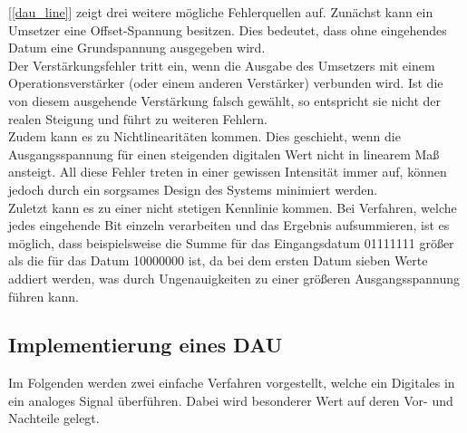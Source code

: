 [\ref{dau_line}] zeigt drei weitere mögliche Fehlerquellen auf. Zunächst kann ein Umsetzer eine Offset-Spannung besitzen. Dies bedeutet, dass ohne eingehendes Datum eine Grundspannung ausgegeben wird.\\
Der Verstärkungsfehler tritt ein, wenn die Ausgabe des Umsetzers mit einem Operationsverstärker (oder einem anderen Verstärker) verbunden wird. Ist die von diesem ausgehende Verstärkung falsch gewählt, so entspricht sie nicht der realen Steigung und führt zu weiteren Fehlern.\\
Zudem kann es zu Nichtlinearitäten kommen. Dies geschieht, wenn die Ausgangsspannung für einen steigenden digitalen Wert nicht in linearem Maß ansteigt. All diese Fehler treten in einer gewissen Intensität immer auf, können jedoch durch ein sorgsames Design des Systems minimiert werden.\\
Zuletzt kann es zu einer nicht stetigen Kennlinie kommen. Bei Verfahren, welche jedes eingehende Bit einzeln verarbeiten und das Ergebnis aufsummieren, ist es möglich, dass beispielsweise die Summe für das Eingangsdatum 01111111 größer als die für das Datum 10000000 ist, da bei dem ersten Datum sieben Werte addiert werden, was durch Ungenauigkeiten zu einer größeren Ausgangsspannung führen kann.

\subsection{Implementierung eines DAU}
Im Folgenden werden zwei einfache Verfahren vorgestellt, welche ein Digitales in ein analoges Signal überführen. Dabei wird besonderer Wert auf deren Vor- und Nachteile gelegt.


